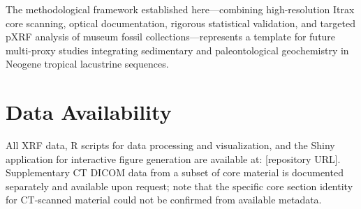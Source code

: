 \documentclass[11pt,a4paper]{article}
\begin{document}
The methodological framework established here---combining high-resolution Itrax core scanning, optical documentation, rigorous statistical validation, and targeted pXRF analysis of museum fossil collections---represents a template for future multi-proxy studies integrating sedimentary and paleontological geochemistry in Neogene tropical lacustrine sequences.

\section*{Data Availability}

All XRF data, R scripts for data processing and visualization, and the Shiny application for interactive figure generation are available at: [repository URL]. Supplementary CT DICOM data from a subset of core material is documented separately and available upon request; note that the specific core section identity for CT-scanned material could not be confirmed from available metadata.




\end{document}
